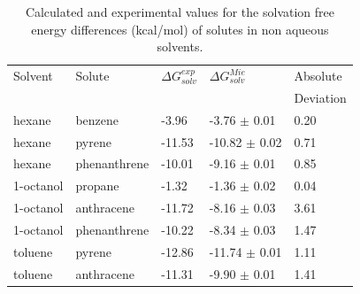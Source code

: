 \begin{table}[h]
\centering
  \caption{Calculated and experimental values for the solvation free energy differences (kcal/mol) of solutes in non aqueous solvents.}
  \label{tbl:solv1}
  \begin{tabular}{lllll}
  	\hline\hline
  	Solvent               & Solute       & $\Delta G_{solv}^{exp}$ & $\Delta G_{solv}^{Mie}$ & Absolute  \\
  	                      &              &                         &                         & Deviation \\ \hline
  	hexane                & benzene      & -3.96                   & -3.76  $\pm$ 0.01       & 0.20      \\
  	hexane                & pyrene       & -11.53                  & -10.82 $\pm$ 0.02       & 0.71      \\
  	hexane                & phenanthrene & -10.01                  & -9.16  $\pm$ 0.01       & 0.85      \\
  	1-octanol             & propane      & -1.32                   & -1.36  $\pm$ 0.02       & 0.04      \\
  	1-octanol             & anthracene   & -11.72                  & -8.16  $\pm$ 0.03       & 3.61      \\
  	1-octanol             & phenanthrene & -10.22                  & -8.34  $\pm$ 0.03       & 1.47      \\
  	toluene               & pyrene       & -12.86                  & -11.74 $\pm$ 0.01       & 1.11      \\
  	toluene               & anthracene   & -11.31                  & -9.90 $\pm$ 0.01        & 1.41      \\
\hline\hline
  \end{tabular}
\end{table}
\FloatBarrier

